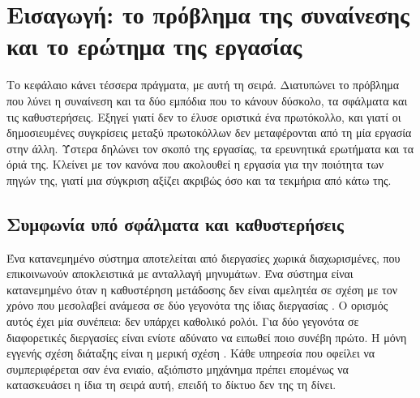 %

\chapter{Εισαγωγή: το πρόβλημα της συναίνεσης και το ερώτημα της εργασίας}
\label{ch:intro}

Το κεφάλαιο κάνει τέσσερα πράγματα, με αυτή τη σειρά. Διατυπώνει το
πρόβλημα που λύνει η συναίνεση και τα δύο εμπόδια που το κάνουν δύσκολο,
τα σφάλματα και τις καθυστερήσεις. Εξηγεί γιατί δεν το έλυσε οριστικά
ένα πρωτόκολλο, και γιατί οι δημοσιευμένες συγκρίσεις μεταξύ πρωτοκόλλων
δεν μεταφέρονται από τη μία εργασία στην άλλη. Ύστερα δηλώνει τον σκοπό
της εργασίας, τα ερευνητικά ερωτήματα και τα όριά της. Κλείνει με τον
κανόνα που ακολουθεί η εργασία για την ποιότητα των πηγών της, γιατί μια
σύγκριση αξίζει ακριβώς όσο και τα τεκμήρια από κάτω της.

\section{Συμφωνία υπό σφάλματα και καθυστερήσεις}
\label{sec:problem}

Ένα κατανεμημένο σύστημα αποτελείται από διεργασίες χωρικά
διαχωρισμένες, που επικοινωνούν αποκλειστικά με ανταλλαγή μηνυμάτων. Ένα
σύστημα είναι κατανεμημένο όταν η καθυστέρηση μετάδοσης δεν είναι
αμελητέα σε σχέση με τον χρόνο που μεσολαβεί ανάμεσα σε δύο γεγονότα της
ίδιας διεργασίας \cite{lamport1978time}. Ο ορισμός αυτός έχει μία
συνέπεια: δεν υπάρχει καθολικό ρολόι. Για δύο γεγονότα σε διαφορετικές
διεργασίες είναι ενίοτε αδύνατο να ειπωθεί ποιο συνέβη πρώτο. Η μόνη
εγγενής σχέση διάταξης είναι η μερική σχέση 
\cite{lamport1978time}. Κάθε υπηρεσία που οφείλει να συμπεριφέρεται σαν
ένα ενιαίο, αξιόπιστο μηχάνημα πρέπει επομένως να κατασκευάσει η ίδια τη
σειρά αυτή, επειδή το δίκτυο δεν της τη δίνει.

